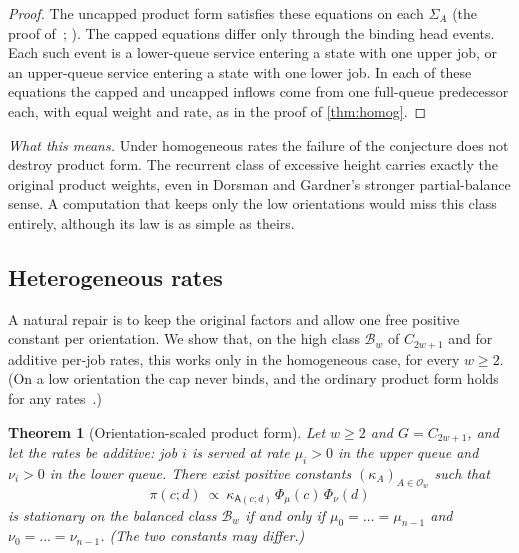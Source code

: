 \documentclass[11pt,a4paper]{article}
\newtheorem{theorem}{Theorem}[section]
\theoremstyle{plain}
\theoremstyle{plain}
\newcommand{\Or}{\mathsf{A}}
\newcommand{\Bal}{\mathcal{B}}
\newcommand{\Obal}{\mathcal{O}}
\newcommand{\Sg}{\Sigma}
\newcommand{\what}[1]{\par\smallskip\noindent\textit{What this means.} #1\par\smallskip}
\begin{document}
\begin{proof}
The uncapped product form satisfies these equations on each $\Sg_A$ (the proof of~\cite[Theorem~5]{CD2021}; \cite[Appendix~B]{DG2024}). The capped equations differ only through the binding head events. Each such event is a lower-queue service entering a state with one upper job, or an upper-queue service entering a state with one lower job. In each of these equations the capped and uncapped inflows come from one full-queue predecessor each, with equal weight and rate, as in the proof of \cref{thm:homog}.
\end{proof}

\what{Under homogeneous rates the failure of the conjecture does not destroy product form. The recurrent class of excessive height carries exactly the original product weights, even in Dorsman and Gardner's stronger partial-balance sense. A computation that keeps only the low orientations would miss this class entirely, although its law is as simple as theirs.}

\subsection{Heterogeneous rates}

A natural repair is to keep the original factors and allow one free positive constant per orientation. We show that, on the high class $\Bal_w$ of $C_{2w+1}$ and for additive per-job rates, this works only in the homogeneous case, for every $w\ge2$. (On a low orientation the cap never binds, and the ordinary product form holds for any rates~\cite[Theorem~7]{DG2024}.)

\begin{theorem}[Orientation-scaled product form]\label{thm:hetero}
Let $w\ge2$ and $G=C_{2w+1}$, and let the rates be additive: job $i$ is served at rate $\mu_i>0$ in the upper queue and $\nu_i>0$ in the lower queue. There exist positive constants $(\kappa_A)_{A\in\Obal_w}$ such that
\[
 \pi(c;d)\ \propto\ \kappa_{\Or(c;d)}\,\Phi_\mu(c)\,\Phi_\nu(d)
\]
is stationary on the balanced class $\Bal_w$ if and only if $\mu_0=\dots=\mu_{n-1}$ and $\nu_0=\dots=\nu_{n-1}$. (The two constants may differ.)
\end{theorem}
\end{document}
